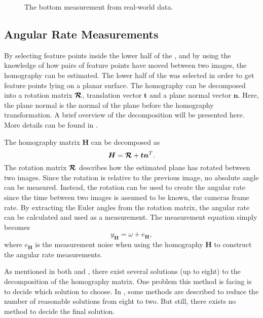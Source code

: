 \begin{figure}[!ht]
	\centering
	\caption{\label{fig:roibottom} The \abbrROI bottom measurement from real-world data.}
\end{figure}

\newpage

\subsection{Angular Rate Measurements}
\label{sec:angratemeas}
By selecting feature points inside the lower half of the \abbrROI, and by using the knowledge of how pairs of feature points have moved between two images, the homography can be estimated.
The lower half of the \abbrROI was selected in order to get feature points lying on a planar surface.
The homography can be decomposed into a rotation matrix $\bm{\mathcal{R}}$, translation vector $\bm{t}$ and a plane normal vector $\bm{n}$.
Here, the plane normal is the normal of the plane before the homography transformation.
A brief overview of the decomposition will be presented here.
More details can be found in \cite{Malis:2007}.

The homography matrix $\bm{H}$ can be decomposed as
%
\begin{equation}
    \bm{H} = \bm{\mathcal{R}} + \bm{t} \bm{n}^T.
\end{equation}
%
The rotation matrix $\bm{\mathcal{R}}$ describes how the estimated plane has rotated between two images.
Since the rotation is relative to the previous image, no absolute angle can be measured.
Instead, the rotation can be used to create the angular rate since the time between two images is assumed to be known, \ie the cameras frame rate.
By extracting the Euler angles from the rotation matrix, the angular rate can be calculated and used as a measurement.
The measurement equation simply becomes
%
\begin{equation}
	y_{\bm{H}} = \omega + e_{\bm{H}},
\end{equation}
%
where $e_{\bm{H}}$ is the measurement noise when using the homography $\bm{H}$ to construct the angular rate measurements.

As mentioned in both \cite{Gabb:2013} and \cite{Malis:2007}, there exist several solutions (up to eight) to the decomposition of the homography matrix.
One problem this method is facing is to decide which solution to choose.
In \cite{Malis:2007}, some methods are described to reduce the number of reasonable solutions from eight to two.
But still, there exists no method to decide the final solution.

